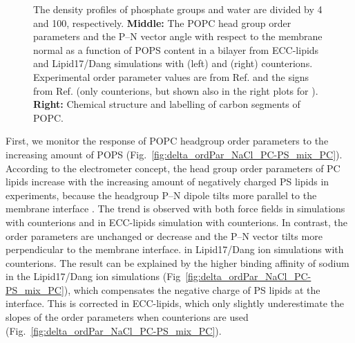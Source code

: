 \documentclass[journal=jpcbfk,manuscript=article]{achemso}
\begin{document}
\begin{figure}[!tbp]
{    The density profiles of phosphate groups and water are divided by 4 and 100, respectively.  
    \textbf{Middle:} The POPC head group order parameters and the P--N vector angle
    with respect to the membrane normal as a function of POPS content in a bilayer
    from ECC-lipids and Lipid17/Dang simulations with  (left) and  (right) counterions.
    Experimental order parameter values are from Ref. 
    and the signs from Ref.  
    (only  counterions, but shown also in the right plots for ).
    \textbf{Right:} Chemical structure and labelling of carbon segments of POPC. 
  }
\end{figure} 



First, we monitor the response of POPC headgroup order parameters to the increasing amount of POPS (Fig.~\ref{fig:delta_ordPar_NaCl_PC-PS_mix_PC}).
According to the electrometer concept, the head group order parameters of PC lipids increase
with the increasing amount of negatively charged PS lipids in experiments, because the headgroup P--N dipole
tilts more parallel to the membrane interface \cite{seelig87,scherer87}.
The trend is observed with both force fields in simulations with  counterions and
in ECC-lipids simulation with  counterions. 
In contrast, the order parameters are unchanged or decrease 
and the P--N vector tilts more perpendicular to the membrane interface.
in Lipid17/Dang ion simulations with  counterions.
The result can be explained by the higher binding affinity of sodium in the
Lipid17/Dang ion simulations (Fig~\ref{fig:delta_ordPar_NaCl_PC-PS_mix_PC}), which
compensates the negative charge of PS lipids at the interface.
This is corrected in ECC-lipids, 
which only slightly underestimate the slopes of the order parameters 
when  counterions are used (Fig.~\ref{fig:delta_ordPar_NaCl_PC-PS_mix_PC}). 
\end{document}

